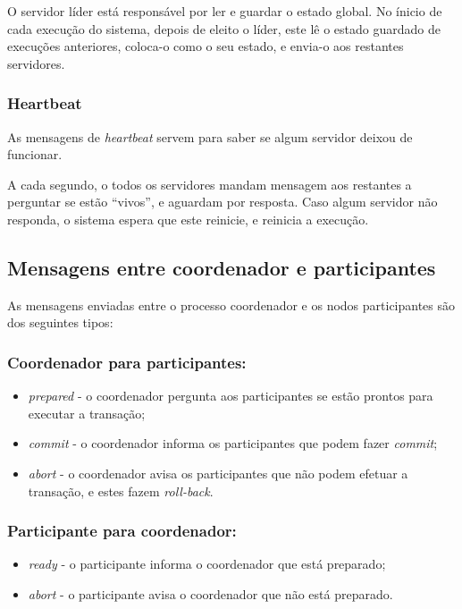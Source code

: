 \documentclass[12pt, a4paper]{report}
\begin{document}
O servidor líder está responsável por ler e guardar o estado global. No ínicio de cada execução do sistema, depois de eleito o líder, este lê o estado guardado de execuções anteriores, coloca-o como o seu estado, e envia-o aos restantes servidores.

\subsubsection{Heartbeat}
As mensagens de \textit{heartbeat} servem para saber se algum servidor deixou de funcionar.

A cada segundo, o todos os servidores mandam mensagem aos restantes a perguntar se estão ``vivos'', e aguardam por resposta.
Caso algum servidor não responda, o sistema espera que este reinicie, e reinicia a execução.

\subsection{Mensagens entre coordenador e participantes}
As mensagens enviadas entre o processo coordenador e os nodos participantes são dos seguintes tipos:
\subsubsection{Coordenador para participantes:}
\begin{itemize}
    \item \textit{prepared} - o coordenador pergunta aos participantes se estão prontos para executar a transação;
    \item \textit{commit} - o coordenador informa os participantes que podem fazer \textit{commit};
    \item \textit{abort} - o coordenador avisa os participantes que não podem efetuar a transação, e estes fazem \textit{roll-back}.
\end{itemize}

\subsubsection{Participante para coordenador:}
\begin{itemize}
    \item \textit{ready} - o participante informa o coordenador que está preparado;
    \item \textit{abort} - o participante avisa o coordenador que não está preparado.
\end{itemize}
\end{document}
